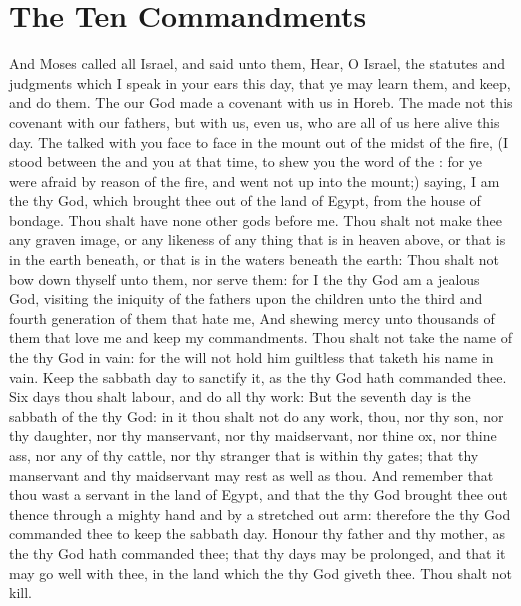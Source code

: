 \section*{The Ten Commandments}
\begin{biblechapter} %
\verse And Moses called all Israel, and said unto them, Hear, O Israel, the statutes and judgments which I speak in your ears this day, that ye may learn them, and keep, and do them.
\verse The \LORD our God made a covenant with us in Horeb.
\verse The \LORD made not this covenant with our fathers, but with us, even us, who are all of us here alive this day.
\verse The \LORD talked with you face to face in the mount out of the midst of the fire,
\verse (I stood between the \LORD and you at that time, to shew you the word of the \LORD: for ye were afraid by reason of the fire, and went not up into the mount;) saying,
\verse I am the \LORD thy God, which brought thee out of the land of Egypt, from the house of bondage.
\verse Thou shalt have none other gods before me.
\verse Thou shalt not make thee any graven image, or any likeness of any thing that is in heaven above, or that is in the earth beneath, or that is in the waters beneath the earth:
\verse Thou shalt not bow down thyself unto them, nor serve them: for I the \LORD thy God am a jealous God, visiting the iniquity of the fathers upon the children unto the third and fourth generation of them that hate me,
\verse And shewing mercy unto thousands of them that love me and keep my commandments.
\verse Thou shalt not take the name of the \LORD thy God in vain: for the \LORD will not hold him guiltless that taketh his name in vain.
\verse Keep the sabbath day to sanctify it, as the \LORD thy God hath commanded thee.
\verse Six days thou shalt labour, and do all thy work:
\verse But the seventh day is the sabbath of the \LORD thy God: in it thou shalt not do any work, thou, nor thy son, nor thy daughter, nor thy manservant, nor thy maidservant, nor thine ox, nor thine ass, nor any of thy cattle, nor thy stranger that is within thy gates; that thy manservant and thy maidservant may rest as well as thou.
\verse And remember that thou wast a servant in the land of Egypt, and that the \LORD thy God brought thee out thence through a mighty hand and by a stretched out arm: therefore the \LORD thy God commanded thee to keep the sabbath day.
\verse Honour thy father and thy mother, as the \LORD thy God hath commanded thee; that thy days may be prolonged, and that it may go well with thee, in the land which the \LORD thy God giveth thee.
\verse Thou shalt not kill.

\end{biblechapter}
